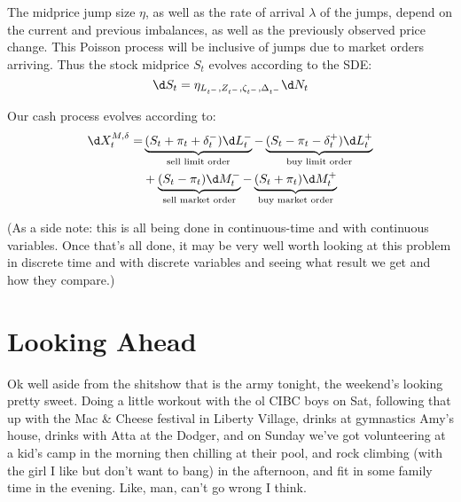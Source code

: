\documentclass[12pt]{article}
\begin{document}
The midprice jump size $\eta$, as well as the rate of arrival $\lambda$ of the jumps, depend on the current and previous imbalances, as well as the previously observed price change. This Poisson process will be inclusive of jumps due to market orders arriving. Thus the stock midprice $S_t$ evolves according to the SDE:
\begin{equation}\label{eq:stockprocess}
\d S_t = \eta_{L_{t^-},Z_{t^-},\zeta_{t^-},\Delta_{t^-}} \d N_t
\end{equation}


Our cash process evolves according to:
\begin{equation}\label{eq:cashprocess}
\begin{split}
\d X^{M, \delta}_t = 	&\underbrace{(S_t + \pi_t + \delta^{-}_t) \d L^{-}_t}_{\text{sell limit order}} - \underbrace{(S_t - \pi_t - \delta^{+}_t) \d L^{+}_t}_{\text{buy limit order}} \\
						&+ \underbrace{(S_t - \pi_t) \d M^{-}_t}_{\text{sell market order}} - \underbrace{(S_t + \pi_t) \d M^{+}_t}_{\text{buy market order}}
\end{split}
\end{equation} 

(As a side note: this is all being done in continuous-time and with continuous variables. Once that's all done, it may be very well worth looking at this problem in discrete time and with discrete variables and seeing what result we get and how they compare.)

\section*{Looking Ahead}
Ok well aside from the shitshow that is the army tonight, the weekend's looking pretty sweet. Doing a little workout with the ol CIBC boys on Sat, following that up with the Mac \& Cheese festival in Liberty Village, drinks at gymnastics Amy's house, drinks with Atta at the Dodger, and on Sunday we've got volunteering at a kid's camp in the morning then chilling at their pool, and rock climbing (with the girl I like but don't want to bang) in the afternoon, and fit in some family time in the evening. Like, man, can't go wrong I think.
\end{document}
